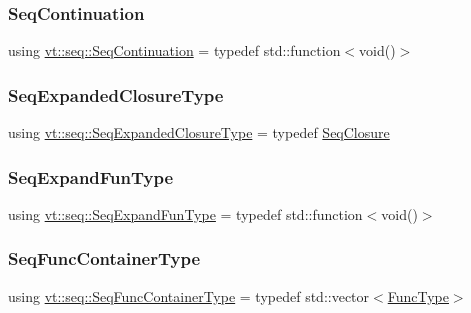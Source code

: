 \mbox{\label{namespacevt_1_1seq_a81dfe143a0308c0f5bc10146c82530e6}} 
\subsubsection{\texorpdfstring{Seq\+Continuation}{SeqContinuation}}
{\footnotesize\ttfamily using \hyperlink{namespacevt_1_1seq_a81dfe143a0308c0f5bc10146c82530e6}{vt\+::seq\+::\+Seq\+Continuation} = typedef std\+::function$<$void()$>$}

\mbox{\label{namespacevt_1_1seq_a322533ee3b8e3443e6808410aea39797}} 
\subsubsection{\texorpdfstring{Seq\+Expanded\+Closure\+Type}{SeqExpandedClosureType}}
{\footnotesize\ttfamily using \hyperlink{namespacevt_1_1seq_a322533ee3b8e3443e6808410aea39797}{vt\+::seq\+::\+Seq\+Expanded\+Closure\+Type} = typedef \hyperlink{structvt_1_1seq_1_1_seq_closure}{Seq\+Closure}}

\mbox{\label{namespacevt_1_1seq_ab345c700c06d135cafba39f711767ad5}} 
\subsubsection{\texorpdfstring{Seq\+Expand\+Fun\+Type}{SeqExpandFunType}}
{\footnotesize\ttfamily using \hyperlink{namespacevt_1_1seq_ab345c700c06d135cafba39f711767ad5}{vt\+::seq\+::\+Seq\+Expand\+Fun\+Type} = typedef std\+::function$<$void()$>$}

\mbox{\label{namespacevt_1_1seq_a3d4575155fb9c0aeeb30b089adfdd04d}} 
\subsubsection{\texorpdfstring{Seq\+Func\+Container\+Type}{SeqFuncContainerType}}
{\footnotesize\ttfamily using \hyperlink{namespacevt_1_1seq_a3d4575155fb9c0aeeb30b089adfdd04d}{vt\+::seq\+::\+Seq\+Func\+Container\+Type} = typedef std\+::vector$<$\hyperlink{namespacevt_1_1seq_a26c632e5cbf02395a8bbd9aa4c761232}{Func\+Type}$>$}

